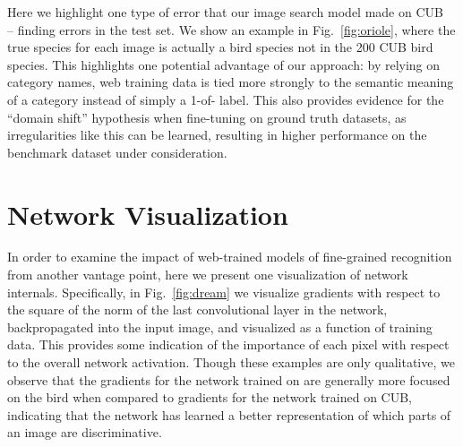 \documentclass[runningheads]{llncs}
\begin{document}
Here we highlight one type of error that our image search model made on CUB~\cite{wah2011multiclass} -- finding errors in the test set.
We show an example in Fig.~\ref{fig:oriole}, where the true species for each image is actually a bird species not in the 200 CUB bird species.
This highlights one potential advantage of our approach: by relying on category names, web training data is tied more strongly to the semantic meaning of a category instead of simply a 1-of- label.
This also provides evidence for the ``domain shift'' hypothesis when fine-tuning on ground truth datasets, as irregularities like this can be learned, resulting in higher performance on the benchmark dataset under consideration.


\section{Network Visualization}

In order to examine the impact of web-trained models of fine-grained recognition from another vantage point, here we present one visualization of network internals.
Specifically, in Fig.~\ref{fig:dream} we visualize gradients with respect to the square of the norm of the last convolutional layer in the network, backpropagated into the input image, and visualized as a function of training data.
This provides some indication of the importance of each pixel with respect to the overall network activation.
Though these examples are only qualitative, we observe that the gradients for the network trained on \lbird{} are generally more focused on the bird when compared to gradients for the network trained on CUB, indicating that the network has learned a better representation of which parts of an image are discriminative.
\end{document}

